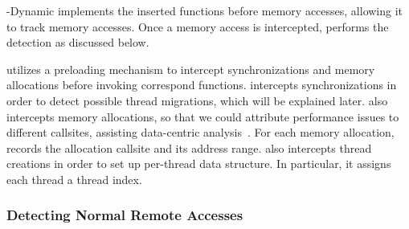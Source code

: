 \NP{}-Dynamic implements the inserted functions before memory accesses, allowing it to track memory accesses. Once a memory access is intercepted, \NP{} performs the detection as discussed below. 

\NP{} utilizes a preloading mechanism to intercept synchronizations and memory allocations before invoking correspond functions.
\NP{} intercepts synchronizations in order to detect possible thread migrations, which will be explained later. \NP{} also intercepts memory allocations, so that we could attribute performance issues to different callsites, assisting data-centric analysis~\cite{XuNuma}. For each memory allocation, \NP{} records the allocation callsite and its address range. 
\NP{} also intercepts thread creations in order to set up per-thread data structure. 
In particular, it assigns each thread a thread index.


\subsubsection{Detecting Normal Remote Accesses}
\label{sec: remote_access}


